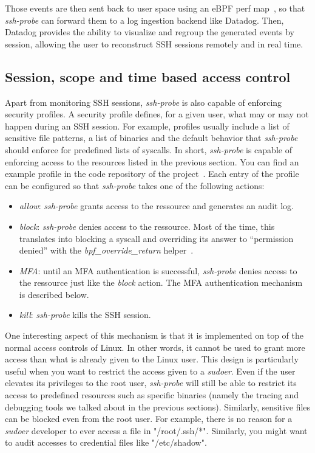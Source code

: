 Those events are then sent back to user space using an eBPF perf map~\cite{MonitoringAndProtectingSSHSessionsWithEBPF:LorenzoDavid}, so that \emph{ssh-probe} can forward them to a log ingestion backend like Datadog.
Then, Datadog provides the ability to visualize and regroup the generated events by session, allowing the user to reconstruct SSH sessions remotely and in real time.

\subsection{Session, scope and time based access control}

Apart from monitoring SSH sessions, \emph{ssh-probe} is also capable of enforcing security profiles.
A security profile defines, for a given user, what may or may not happen during an SSH session.
For example, profiles usually include a list of sensitive file patterns, a list of binaries and the default behavior that \emph{ssh-probe} should enforce for predefined lists of syscalls.
In short, \emph{ssh-probe} is capable of enforcing access to the resources listed in the previous section.
You can find an example profile in the code repository of the project~\cite{MonitoringAndProtectingSSHSessionsWithEBPF:Profile}.
Each entry of the profile can be configured so that \emph{ssh-probe} takes one of the following actions:

\begin{itemize}
  \item \emph{allow}: \emph{ssh-probe} grants access to the ressource and generates an audit log.
  \item \emph{block}: \emph{ssh-probe} denies access to the ressource.
  Most of the time, this translates into blocking a syscall and overriding its answer to “permission denied” with the \emph{bpf\_override\_return} helper~\cite{MonitoringAndProtectingSSHSessionsWithEBPF:OverrideReturn}.
  \item \emph{MFA}: until an MFA authentication is successful, \emph{ssh-probe} denies access to the ressource just like the \emph{block} action.
  The MFA authentication mechanism is described below.
  \item \emph{kill}: \emph{ssh-probe} kills the SSH session.
\end{itemize}

One interesting aspect of this mechanism is that it is implemented on top of the normal access controls of Linux.
In other words, it cannot be used to grant more access than what is already given to the Linux user.
This design is particularly useful when you want to restrict the access given to a \emph{sudoer}.
Even if the user elevates its privileges to the root user, \emph{ssh-probe} will still be able to restrict its access to predefined resources such as specific binaries (namely the tracing and debugging tools we talked about in the previous sections).
Similarly, sensitive files can be blocked even from the root user.
For example, there is no reason for a \emph{sudoer} developer to ever access a file in "/root/.ssh/*".
Similarly, you might want to audit accesses to credential files like "/etc/shadow".

